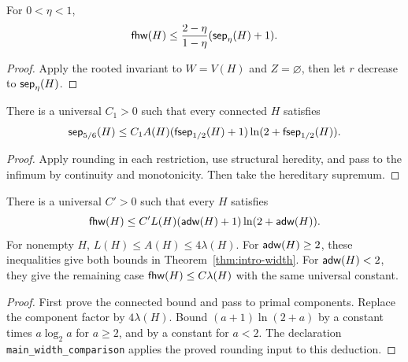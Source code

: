 \begin{lemma}
\label{lem:lean-recursive-decomposition}
\leanok
For $0<\eta<1$,
\[
 \mathsf{fhw}(H)\le\frac{2-\eta}{1-\eta}(\mathsf{sep}_\eta(H)+1).
\]
\end{lemma}
\begin{proof}\leanok
Apply the rooted invariant to $W=V(H)$ and $Z=\varnothing$, then let
$r$ decrease to $\mathsf{sep}_\eta(H)$.
\end{proof}

\begin{lemma}
\label{lem:round-hereditary}
\leanok
There is a universal $C_1>0$ such that every connected $H$ satisfies
\[
 \mathsf{sep}_{5/6}(H)\le C_1 A(H)
 (\mathsf{fsep}_{1/2}(H)+1)\ln(2+\mathsf{fsep}_{1/2}(H)).
\]
\end{lemma}
\begin{proof}\leanok
Apply rounding in each restriction, use structural heredity, and pass to
the infimum by continuity and monotonicity. Then take the hereditary
supremum.
\end{proof}

\begin{theorem}
\label{thm:regularized-comparison}
\leanok
There is a universal $C'>0$ such that every $H$ satisfies
\[
 \mathsf{fhw}(H)\le C'L(H)(\mathsf{adw}(H)+1)\ln(2+\mathsf{adw}(H)).
\]
For nonempty $H$, $L(H)\le A(H)\le4\lambda(H)$. For $\mathsf{adw}(H)\ge2$,
these inequalities give both bounds in Theorem~\ref{thm:intro-width}.
For $\mathsf{adw}(H)<2$, they give the remaining case
$\mathsf{fhw}(H)\le C\lambda(H)$ with the same universal constant.
\end{theorem}
\begin{proof}\leanok
First prove the connected bound and pass to primal components. Replace the
component factor by $4\lambda(H)$. Bound $(a+1)\ln(2+a)$ by a constant
times $a\log_2 a$ for $a\ge2$, and by a constant for $a<2$.
The declaration \texttt{main\_width\_comparison} applies the proved
rounding input to this deduction.
\end{proof}

